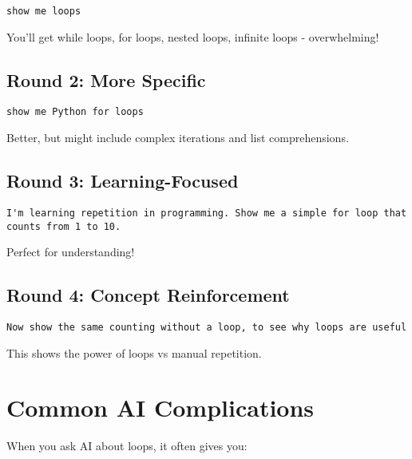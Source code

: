 \documentclass[
  letterpaper,
  DIV=11,
  numbers=noendperiod,
  oneside]{scrreprt}
\begin{document}
\begin{verbatim}
show me loops
\end{verbatim}

You'll get while loops, for loops, nested loops, infinite loops -
overwhelming!

\subsection{Round 2: More Specific}\label{round-2-more-specific-3}

\begin{verbatim}
show me Python for loops
\end{verbatim}

Better, but might include complex iterations and list comprehensions.

\subsection{Round 3: Learning-Focused}\label{round-3-learning-focused-4}

\begin{verbatim}
I'm learning repetition in programming. Show me a simple for loop that counts from 1 to 10.
\end{verbatim}

Perfect for understanding!

\subsection{Round 4: Concept
Reinforcement}\label{round-4-concept-reinforcement-1}

\begin{verbatim}
Now show the same counting without a loop, to see why loops are useful
\end{verbatim}

This shows the power of loops vs manual repetition.

\section{Common AI Complications}\label{common-ai-complications-4}

When you ask AI about loops, it often gives you:
\end{document}
